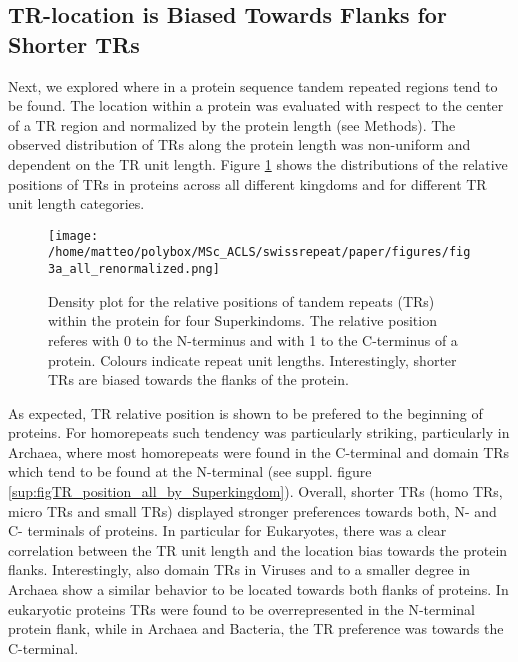 \documentclass[a4,center,fleqn]{NAR}
\begin{document}
\subsection{TR-location is Biased Towards Flanks for Shorter TRs}
Next, we explored where in a protein sequence tandem repeated regions tend to be found. The location within a protein was evaluated with respect to the center of a TR region and normalized by the protein length (see Methods).  
The observed distribution of TRs along the protein length was non-uniform and dependent on the TR unit length. Figure \ref{fig3a_all_renormalized} shows the distributions of the relative positions of TRs in proteins across all different kingdoms and for different TR unit length categories.

\begin{figure}[t]
\begin{center}
\texttt{[image: /home/matteo/polybox/MSc\_ACLS/swissrepeat/paper/figures/fig3a\_all\_renormalized.png]}
\end{center}
\caption{Density plot for the relative positions of tandem repeats (TRs) within the protein for four Superkindoms. The relative position referes with 0 to the N-terminus and with 1 to the C-terminus of a protein. Colours indicate repeat unit lengths. Interestingly, shorter TRs are biased towards the flanks of the protein.}
\label{fig3a_all_renormalized}
\end{figure}

As expected, TR relative position is shown to be prefered to the beginning of proteins.  For homorepeats such tendency was particularly striking, particularly in Archaea, where most homorepeats were found in the C-terminal and domain TRs which tend to be found at the N-terminal (see suppl. figure \ref{sup:figTR_position_all_by_Superkingdom}).
Overall, shorter TRs (homo TRs, micro TRs and small TRs) displayed stronger preferences towards both, N- and C- terminals of proteins. 
In particular for Eukaryotes, there was a clear correlation between the TR unit length and the location bias towards the protein flanks. 
Interestingly, also domain TRs in Viruses and to a smaller degree in Archaea show a similar behavior to be located towards both flanks of proteins.
In eukaryotic proteins TRs were found to be overrepresented in the N-terminal protein flank, while in Archaea and Bacteria, the TR preference was towards the C-terminal. 
\end{document}
